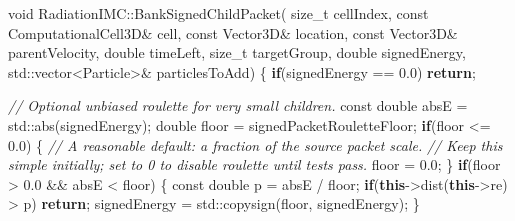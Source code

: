\documentclass[
]{article}
\newenvironment{Shaded}{}{}
\newcommand{\AttributeTok}[1]{\textcolor[rgb]{0.49,0.56,0.16}{#1}}
\newcommand{\BuiltInTok}[1]{\textcolor[rgb]{0.00,0.50,0.00}{#1}}
\newcommand{\CommentTok}[1]{\textcolor[rgb]{0.38,0.63,0.69}{\textit{#1}}}
\newcommand{\ControlFlowTok}[1]{\textcolor[rgb]{0.00,0.44,0.13}{\textbf{#1}}}
\newcommand{\DataTypeTok}[1]{\textcolor[rgb]{0.56,0.13,0.00}{#1}}
\newcommand{\FloatTok}[1]{\textcolor[rgb]{0.25,0.63,0.44}{#1}}
\newcommand{\KeywordTok}[1]{\textcolor[rgb]{0.00,0.44,0.13}{\textbf{#1}}}
\newcommand{\NormalTok}[1]{#1}
\newcommand{\OperatorTok}[1]{\textcolor[rgb]{0.40,0.40,0.40}{#1}}
\begin{document}
\begin{Shaded}
\begin{Highlighting}[]
\DataTypeTok{void}\NormalTok{ RadiationIMC}\OperatorTok{::}\NormalTok{BankSignedChildPacket}\OperatorTok{(}
    \DataTypeTok{size\_t}\NormalTok{ cellIndex}\OperatorTok{,}
    \AttributeTok{const}\NormalTok{ ComputationalCell3D}\OperatorTok{\&}\NormalTok{ cell}\OperatorTok{,}
    \AttributeTok{const}\NormalTok{ Vector3D}\OperatorTok{\&}\NormalTok{ location}\OperatorTok{,}
    \AttributeTok{const}\NormalTok{ Vector3D}\OperatorTok{\&}\NormalTok{ parentVelocity}\OperatorTok{,}
    \DataTypeTok{double}\NormalTok{ timeLeft}\OperatorTok{,}
    \DataTypeTok{size\_t}\NormalTok{ targetGroup}\OperatorTok{,}
    \DataTypeTok{double}\NormalTok{ signedEnergy}\OperatorTok{,}
    \BuiltInTok{std::}\NormalTok{vector}\OperatorTok{\textless{}}\NormalTok{Particle}\OperatorTok{\textgreater{}\&}\NormalTok{ particlesToAdd}\OperatorTok{)}
\OperatorTok{\{}
    \ControlFlowTok{if}\OperatorTok{(}\NormalTok{signedEnergy }\OperatorTok{==} \FloatTok{0.0}\OperatorTok{)}
        \ControlFlowTok{return}\OperatorTok{;}

    \CommentTok{// Optional unbiased roulette for very small children.}
    \AttributeTok{const} \DataTypeTok{double}\NormalTok{ absE }\OperatorTok{=} \BuiltInTok{std::}\NormalTok{abs}\OperatorTok{(}\NormalTok{signedEnergy}\OperatorTok{);}
    \DataTypeTok{double}\NormalTok{ floor }\OperatorTok{=}\NormalTok{ signedPacketRouletteFloor}\OperatorTok{;}
    \ControlFlowTok{if}\OperatorTok{(}\NormalTok{floor }\OperatorTok{\textless{}=} \FloatTok{0.0}\OperatorTok{)}
    \OperatorTok{\{}
        \CommentTok{// A reasonable default: a fraction of the source packet scale.}
        \CommentTok{// Keep this simple initially; set to 0 to disable roulette until tests pass.}
\NormalTok{        floor }\OperatorTok{=} \FloatTok{0.0}\OperatorTok{;}
    \OperatorTok{\}}
    \ControlFlowTok{if}\OperatorTok{(}\NormalTok{floor }\OperatorTok{\textgreater{}} \FloatTok{0.0} \OperatorTok{\&\&}\NormalTok{ absE }\OperatorTok{\textless{}}\NormalTok{ floor}\OperatorTok{)}
    \OperatorTok{\{}
        \AttributeTok{const} \DataTypeTok{double}\NormalTok{ p }\OperatorTok{=}\NormalTok{ absE }\OperatorTok{/}\NormalTok{ floor}\OperatorTok{;}
        \ControlFlowTok{if}\OperatorTok{(}\KeywordTok{this}\OperatorTok{{-}\textgreater{}}\NormalTok{dist}\OperatorTok{(}\KeywordTok{this}\OperatorTok{{-}\textgreater{}}\NormalTok{re}\OperatorTok{)} \OperatorTok{\textgreater{}}\NormalTok{ p}\OperatorTok{)}
            \ControlFlowTok{return}\OperatorTok{;}
\NormalTok{        signedEnergy }\OperatorTok{=} \BuiltInTok{std::}\NormalTok{copysign}\OperatorTok{(}\NormalTok{floor}\OperatorTok{,}\NormalTok{ signedEnergy}\OperatorTok{);}
    \OperatorTok{\}}


\end{Highlighting}
\end{Shaded}
\end{document}
